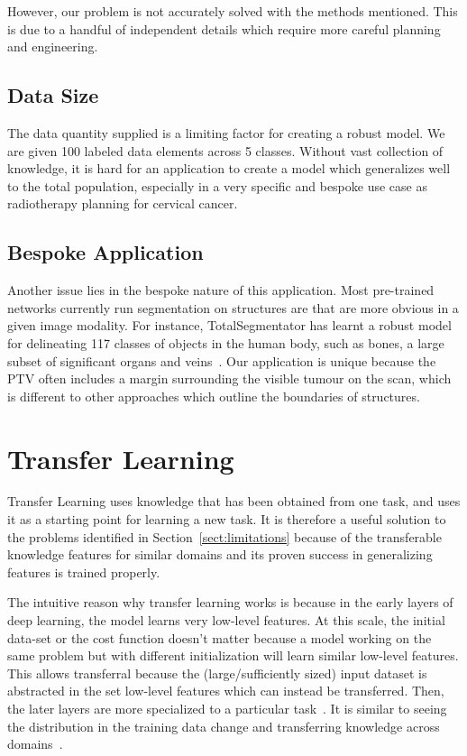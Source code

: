 \documentclass[11pt,twoside]{report}
\begin{document}
However, our problem is not accurately solved with the methods mentioned. This is due to a handful of independent details which require more careful planning and engineering.

\subsection{Data Size}\label{sect:solving-the-problem-data-size}

The data quantity supplied is a limiting factor for creating a robust model. We are given 100 labeled data elements across 5 classes. Without vast collection of knowledge, it is hard for an application to create a model which generalizes well to the total population, especially in a very specific and bespoke use case as radiotherapy planning for cervical cancer.

\subsection{Bespoke Application}\label{sect:solving-the-problem-bespoke-application}

Another issue lies in the bespoke nature of this application. Most pre-trained networks currently run segmentation on structures are that are more obvious in a given image modality. For instance, TotalSegmentator has learnt a robust model for delineating 117 classes of objects in the human body, such as bones, a large subset of significant organs and veins~\cite{totalsegmentor-git}. Our application is unique because the PTV often includes a margin surrounding the visible tumour on the scan, which is different to other approaches which outline the boundaries of structures.

\section{Transfer Learning}\label{sect:transfer-learning}

Transfer Learning uses knowledge that has been obtained from one task, and uses it as a starting point for learning a new task. It is therefore a useful solution to the problems identified in Section~\ref{sect:limitations} because of the transferable knowledge features for similar domains  and its proven success in generalizing features is trained properly.

The intuitive reason why transfer learning works is because in the early layers of deep learning, the model learns very low-level features. At this scale, the initial data-set or the cost function doesn't matter because a model working on the same problem but with different initialization will learn similar low-level features. This allows transferral because the (large/sufficiently sized) input dataset is abstracted in the set low-level features which can instead be transferred. Then, the later layers are more specialized to a particular task~\cite{deep-learning-book}. It is similar to seeing the distribution in the training data change and transferring knowledge across domains~\cite{survey-on-transfer-learning}.
\end{document}
